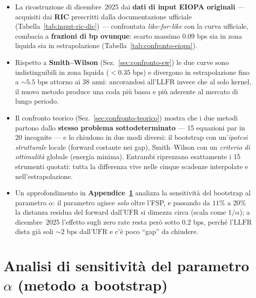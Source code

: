 \documentclass[11pt,a4paper]{article}
\theoremstyle{plain}
\theoremstyle{definition}
\theoremstyle{remark}
\newcommand{\UFR}{\mathrm{UFR}}
\newcommand{\LLFR}{\mathrm{LLFR}}
\begin{document}
\begin{itemize}
  \item La ricostruzione di dicembre~2025 dai \textbf{dati di input EIOPA originali} ---
        acquisiti dai \textbf{RIC} prescritti dalla documentazione ufficiale
        (Tabella~\ref{tab:input-ric-dic}) --- confrontata \emph{like-for-like} con la curva
        ufficiale, combacia a \textbf{frazioni di bp ovunque}: scarto massimo $0.09$ bps sia
        in zona liquida sia in estrapolazione (Tabella~\ref{tab:confronto-eiopa}).
  \item Rispetto a \textbf{Smith--Wilson} (Sez.~\ref{sec:confronto-sw}) le due curve sono
        indistinguibili in zona liquida ($<0.35$ bps) e divergono in estrapolazione fino a
        $\sim\!5.5$ bps attorno ai 38 anni: ancorandosi all'$\LLFR$ invece che al solo kernel,
        il nuovo metodo produce una coda pi\`u bassa e pi\`u aderente al mercato di lungo periodo.
  \item Il confronto teorico (Sez.~\ref{sec:confronto-teorico}) mostra che i due metodi
        partono dallo \textbf{stesso problema sottodeterminato} --- 15 equazioni par in 20
        incognite --- e lo chiudono in due modi diversi: il bootstrap con un'\emph{ipotesi
        strutturale} locale (forward costante nei gap), Smith--Wilson con un \emph{criterio di
        ottimalit\`a} globale (energia minima). Entrambi riprezzano esattamente i 15 strumenti
        quotati: tutta la differenza vive nelle cinque scadenze interpolate e
        nell'estrapolazione.
  \item Un approfondimento in \textbf{Appendice~\ref{sec:sens-alpha}} analizza la
        sensitivit\`a del bootstrap al parametro $\alpha$: il parametro agisce \emph{solo}
        oltre l'FSP, e passando da $11\%$ a $20\%$ la distanza residua del forward dall'$\UFR$
        si dimezza circa (scala come $1/\alpha$); a dicembre~2025 l'effetto sugli zero rate
        resta per\`o sotto $0.2$ bps, perch\'e l'$\LLFR$ dista gi\`a soli $\sim\!2$ bps
        dall'$\UFR$ e c'\`e poco ``gap'' da chiudere.
\end{itemize}

\appendix

\section{Analisi di sensitivit\`a del parametro \texorpdfstring{$\alpha$}{alpha} (metodo a bootstrap)}
\label{sec:sens-alpha}
\end{document}
